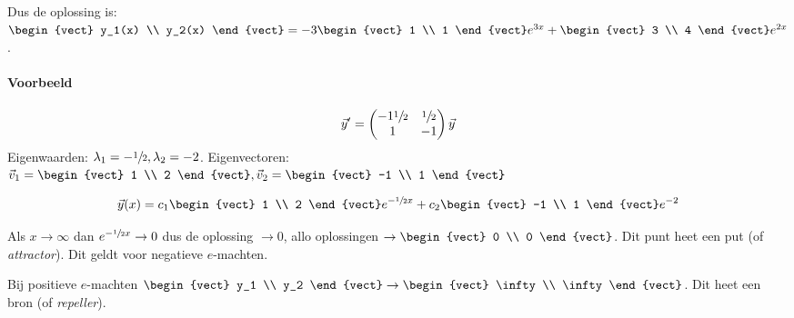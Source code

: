 Dus de oplossing is:
$ \begin{vect} y_1(x) \\ y_2(x) \end{vect} = -3 \begin{vect} 1 \\ 1 \end{vect} e^{3x} + \begin{vect} 3 \\ 4 \end{vect} e^{2x}$.

\paragraph{Voorbeeld}
\[ \vec{y}' = \begin{pmatrix} -1 \sfrac{1}{2} & \sfrac{1}{2} \\ 1 & -1 \end{pmatrix} \vec{y} \]
Eigenwaarden: $\lambda_1 = - \sfrac{1}{2}, \lambda_2 = -2$. Eigenvectoren: $\vec{v}_1 = \begin{vect} 1 \\ 2 \end{vect}, \vec{v}_2 = \begin{vect} -1 \\ 1 \end{vect}$

\[ \vec{y}(x) = c_1 \begin{vect} 1 \\ 2 \end{vect} e^{-\sfrac{1}{2}x} + c_2 \begin{vect} -1 \\ 1 \end{vect} e^{-2} \]

Als $x \to \infty$ dan $e^{-\sfrac{1}{2}x} \to 0$ dus de oplossing $\to 0$, allo oplossingen $\to \begin{vect} 0 \\ 0 \end{vect}$. Dit punt heet een put (of \emph{attractor}).  Dit geldt voor negatieve $e$-machten.

Bij positieve $e$-machten $\begin{vect} y_1 \\ y_2 \end{vect} \to \begin{vect} \infty \\ \infty \end{vect}$. Dit heet een bron (of \emph{repeller}). 

